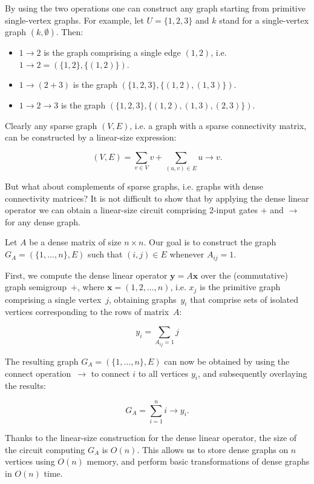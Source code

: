 \documentclass[11pt,letterpaper]{article}
\begin{document}
By using the two operations one can construct any graph starting from primitive
single-vertex graphs. For example, let $U=\{1,2,3\}$ and $k$ stand for a
single-vertex graph $({k}, \emptyset)$. Then:

\begin{itemize}
  \item $1 \rightarrow 2$ is the graph comprising a single edge $(1,2)$, i.e.
  $1 \rightarrow 2 = (\{1,2\}, \{(1,2)\})$.
  \item $1 \rightarrow (2 + 3)$ is the graph $(\{1,2,3\}, \{(1,2),(1,3)\})$.
  \item $1 \rightarrow 2 \rightarrow 3$ is the graph $(\{1,2,3\}, \{(1,2),(1,3),(2,3)\})$.
\end{itemize}

\noindent
Clearly any sparse graph $(V, E)$, i.e. a graph with a sparse connectivity
matrix, can be constructed by a linear-size expression:

\[
(V, E) = \sum_{v \in V} v + \sum_{(u,v) \in E} u \rightarrow v.
\]

\noindent
But what about complements of sparse graphs, i.e. graphs with dense
connectivity matrices? It is not difficult to show that by applying the dense
linear operator we can obtain a linear-size circuit comprising 2-input gates
$+$ and $\rightarrow$ for any dense graph.

Let $A$ be a dense matrix of size $n\times n$. Our goal is to construct the
graph $G_A = (\{1, \dots, n\}, E)$ such that $(i,j) \in E$ whenever $A_{ij}=1$.

First, we compute the dense linear operator $\mathbf{y} = A \mathbf{x}$ over the
(commutative) graph semigroup~$+$, where $\mathbf{x} = (1, 2, \dots, n)$, i.e.
$x_j$ is the primitive graph comprising a single vertex~$j$, obtaining
graphs~$y_i$ that comprise sets of isolated vertices corresponding to the rows
of matrix~$A$:

\[
y_i = \sum_{A_{ij}=1} j
\]

The resulting graph $G_A = (\{1, \dots, n\}, E)$ can now be obtained by using
the connect operation~$\rightarrow$ to connect $i$ to all vertices $y_i$, and
subsequently overlaying the results:

\[
G_A = \sum_{i=1}^{n} i \rightarrow y_i.
\]

Thanks to the linear-size construction for the dense linear operator, the size
of the circuit computing $G_A$ is $O(n)$. This allows us to store dense graphs
on $n$ vertices using $O(n)$ memory, and perform basic transformations of dense
graphs in $O(n)$ time.
\end{document}
